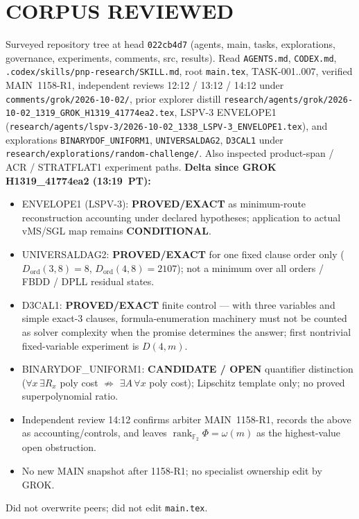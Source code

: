 \documentclass[11pt]{article}
\begin{document}
\section*{CORPUS REVIEWED}
Surveyed repository tree at head \texttt{022cb4d7} (agents, main, tasks, explorations,
governance, experiments, comments, src, results). Read \texttt{AGENTS.md},
\texttt{CODEX.md}, \texttt{.codex/skills/pnp-research/SKILL.md}, root
\texttt{main.tex}, TASK-001..007, verified MAIN~1158-R1,
independent reviews 12:12 / 13:12 / 14:12 under \texttt{comments/grok/2026-10-02/},
prior explorer distill
\texttt{research/agents/grok/2026-10-02\_1319\_GROK\_H1319\_41774ea2.tex},
LSPV-3 ENVELOPE1
(\texttt{research/agents/lspv-3/2026-10-02\_1338\_LSPV-3\_ENVELOPE1.tex}),
and explorations
\texttt{BINARYDOF\_UNIFORM1}, \texttt{UNIVERSALDAG2}, \texttt{D3CAL1}
under \texttt{research/explorations/random-challenge/}.
Also inspected product-span / ACR / STRATFLAT1 experiment paths.
\textbf{Delta since GROK H1319\_41774ea2 (13:19~PT):}
\begin{itemize}
\item ENVELOPE1 (LSPV-3): \textbf{PROVED/EXACT} as minimum-route reconstruction
accounting under declared hypotheses; application to actual vMS/SGL map remains
\textbf{CONDITIONAL}.
\item UNIVERSALDAG2: \textbf{PROVED/EXACT} for one fixed clause order only
($D_{\mathrm{ord}}(3,8)=8$, $D_{\mathrm{ord}}(4,8)=2107$); not a minimum over
all orders / FBDD / DPLL residual states.
\item D3CAL1: \textbf{PROVED/EXACT} finite control --- with three variables and
simple exact-3 clauses, formula-enumeration machinery must not be counted as
solver complexity when the promise determines the answer; first nontrivial
fixed-variable experiment is $D(4,m)$.
\item BINARYDOF\_UNIFORM1: \textbf{CANDIDATE / OPEN} quantifier distinction
($\forall x\,\exists R_x$ poly cost $\not\Rightarrow$ $\exists A\,\forall x$ poly cost);
Lipschitz template only; no proved superpolynomial ratio.
\item Independent review 14:12 confirms arbiter MAIN~1158-R1, records the above
as accounting/controls, and leaves $\operatorname{rank}_{\mathbb F_2}\Phi=\omega(m)$
as the highest-value open obstruction.
\item No new MAIN snapshot after 1158-R1; no specialist ownership edit by GROK.
\end{itemize}
Did not overwrite peers; did not edit \texttt{main.tex}.
\end{document}
